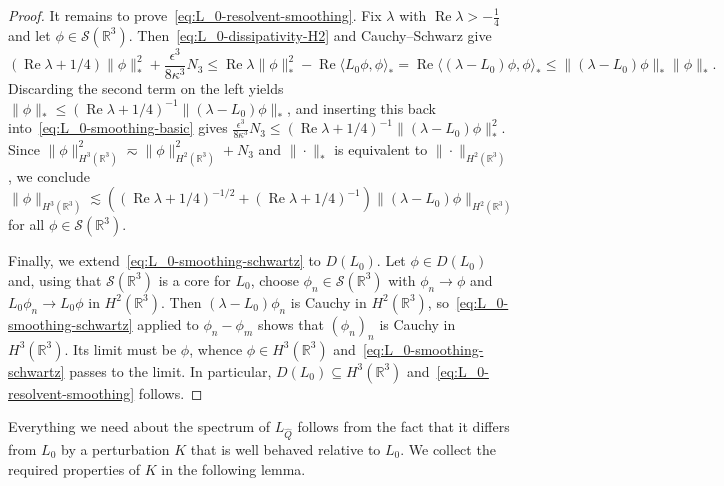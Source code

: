 \documentclass[11pt]{article}
\DeclareMathOperator{\real}{Re}
\begin{document}
\begin{proof}
  It remains to prove~\eqref{eq:L_0-resolvent-smoothing}. Fix
  \(\lambda\) with \(\real \lambda > -\frac{1}{4}\) and let
  \(\phi \in \mathcal{S}(\mathbb{R}^{3})\).
  Then~\eqref{eq:L_0-dissipativity-H2} and Cauchy--Schwarz give
  \begin{equation}\label{eq:L_0-smoothing-basic}
    (\real \lambda + 1/4)\|\phi\|_{*}^{2} + \frac{\epsilon^{3}}{8\kappa^{3}} N_{3}
    \leq \real \lambda \|\phi\|_{*}^{2} - \real\langle L_{0}\phi, \phi\rangle_{*}
    = \real\langle (\lambda - L_{0})\phi, \phi\rangle_{*}
    \leq \|(\lambda - L_{0})\phi\|_{*}\|\phi\|_{*}.
  \end{equation}
  Discarding the second term on the left yields
  \(\|\phi\|_{*} \leq (\real \lambda + 1/4)^{-1}\|(\lambda -
  L_{0})\phi\|_{*}\), and inserting this back
  into~\eqref{eq:L_0-smoothing-basic} gives
  \(\frac{\epsilon^{3}}{8\kappa^{3}} N_{3} \leq (\real \lambda +
  1/4)^{-1}\|(\lambda - L_{0})\phi\|_{*}^{2}\). Since
  \(\|\phi\|_{H^{3}(\mathbb{R}^{3})}^{2} \eqsim
  \|\phi\|_{H^{2}(\mathbb{R}^{3})}^{2} + N_{3}\) and \(\|\cdot\|_{*}\)
  is equivalent to \(\|\cdot\|_{H^{2}(\mathbb{R}^{3})}\), we conclude
  \begin{equation}\label{eq:L_0-smoothing-schwartz}
    \|\phi\|_{H^{3}(\mathbb{R}^{3})}
    \lesssim \left((\real \lambda + 1/4)^{-1/2} + (\real \lambda + 1/4)^{-1}\right)
    \|(\lambda - L_{0})\phi\|_{H^{2}(\mathbb{R}^{3})}
  \end{equation}
  for all \(\phi \in \mathcal{S}(\mathbb{R}^{3})\).

  Finally, we extend~\eqref{eq:L_0-smoothing-schwartz} to \(D(L_{0})\).
  Let \(\phi \in D(L_{0})\) and, using that
  \(\mathcal{S}(\mathbb{R}^{3})\) is a core for \(L_{0}\), choose
  \(\phi_{n} \in \mathcal{S}(\mathbb{R}^{3})\) with
  \(\phi_{n} \to \phi\) and \(L_{0}\phi_{n} \to L_{0}\phi\) in
  \(H^{2}(\mathbb{R}^{3})\). Then \((\lambda - L_{0})\phi_{n}\) is
  Cauchy in \(H^{2}(\mathbb{R}^{3})\),
  so~\eqref{eq:L_0-smoothing-schwartz} applied to
  \(\phi_{n} - \phi_{m}\) shows that \((\phi_{n})_{n}\) is Cauchy in
  \(H^{3}(\mathbb{R}^{3})\). Its limit must be \(\phi\), whence
  \(\phi \in H^{3}(\mathbb{R}^{3})\)
  and~\eqref{eq:L_0-smoothing-schwartz} passes to the limit. In
  particular, \(D(L_{0}) \subseteq H^{3}(\mathbb{R}^{3})\)
  and~\eqref{eq:L_0-resolvent-smoothing} follows.
\end{proof}

Everything we need about the spectrum of \(L_{\hat{Q}}\) follows from
the fact that it differs from \(L_{0}\) by a perturbation \(K\) that
is well behaved relative to \(L_{0}\). We collect the required
properties of \(K\) in the following lemma.
\end{document}
